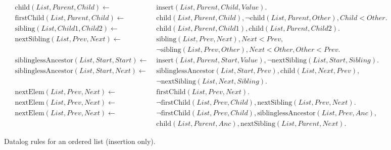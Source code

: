\documentclass[twocolumn,10pt]{article}
\begin{document}
\begin{figure*}
\begin{align*}
    \mathrm{child}(\mathit{List}, \mathit{Parent}, \mathit{Child}) \leftarrow\; &
    \mathrm{insert}(\mathit{List}, \mathit{Parent}, \mathit{Child}, \mathit{Value}).
\\
    \mathrm{firstChild}(\mathit{List}, \mathit{Parent}, \mathit{Child}) \leftarrow\; &
    \mathrm{child}(\mathit{List}, \mathit{Parent}, \mathit{Child}),
    \neg\mathrm{child}(\mathit{List}, \mathit{Parent}, \mathit{Other}),
    \mathit{Child} < \mathit{Other}.
\\
    \mathrm{sibling}(\mathit{List}, \mathit{Child1}, \mathit{Child2}) \leftarrow\; &
    \mathrm{child}(\mathit{List}, \mathit{Parent}, \mathit{Child1}),
    \mathrm{child}(\mathit{List}, \mathit{Parent}, \mathit{Child2}).
\\
    \mathrm{nextSibling}(\mathit{List}, \mathit{Prev}, \mathit{Next}) \leftarrow\; &
    \mathrm{sibling}(\mathit{List}, \mathit{Prev}, \mathit{Next}),
    \mathit{Next} < \mathit{Prev},\\&
    \neg\mathrm{sibling}(\mathit{List}, \mathit{Prev}, \mathit{Other}),
    \mathit{Next} < \mathit{Other},
    \mathit{Other} < \mathit{Prev}.
\\
    \mathrm{siblinglessAncestor}(\mathit{List}, \mathit{Start}, \mathit{Start}) \leftarrow\; &
    \mathrm{insert}(\mathit{List}, \mathit{Parent}, \mathit{Start}, \mathit{Value}),
    \neg\mathrm{nextSibling}(\mathit{List}, \mathit{Start}, \mathit{Sibling}).
\\
    \mathrm{siblinglessAncestor}(\mathit{List}, \mathit{Start}, \mathit{Next}) \leftarrow\; &
    \mathrm{siblinglessAncestor}(\mathit{List}, \mathit{Start}, \mathit{Prev}),
    \mathrm{child}(\mathit{List}, \mathit{Next}, \mathit{Prev}), \\&
    \neg\mathrm{nextSibling}(\mathit{List}, \mathit{Next}, \mathit{Sibling}).
\\
    \mathrm{nextElem}(\mathit{List}, \mathit{Prev}, \mathit{Next}) \leftarrow\; &
    \mathrm{firstChild}(\mathit{List}, \mathit{Prev}, \mathit{Next}).
\\
    \mathrm{nextElem}(\mathit{List}, \mathit{Prev}, \mathit{Next}) \leftarrow\; &
    \neg\mathrm{firstChild}(\mathit{List}, \mathit{Prev}, \mathit{Child}),
    \mathrm{nextSibling}(\mathit{List}, \mathit{Prev}, \mathit{Next}).
\\
    \mathrm{nextElem}(\mathit{List}, \mathit{Prev}, \mathit{Next}) \leftarrow\; &
    \neg\mathrm{firstChild}(\mathit{List}, \mathit{Prev}, \mathit{Child}),
    \mathrm{siblinglessAncestor}(\mathit{List}, \mathit{Prev}, \mathit{Anc}), \\&
    \mathrm{child}(\mathit{List}, \mathit{Parent}, \mathit{Anc}),
    \mathrm{nextSibling}(\mathit{List}, \mathit{Parent}, \mathit{Next}).
\end{align*}
\caption{Datalog rules for an ordered list (insertion only).}
\end{figure*}

{\footnotesize

{}}
\end{document}
